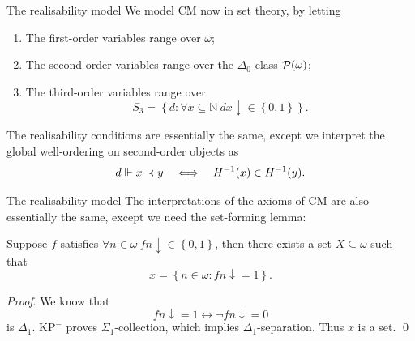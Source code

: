 \documentclass{beamer}
\begin{document}
\begin{frame}{The realisability model}
  We model $\mathrm{CM}$ now in set theory, by letting
  \begin{enumerate}
    \item The first-order variables range over $\omega$;
    \item The second-order variables range over the $\Delta_0$-class $\mathcal{P}\mleft(\omega\mright)$;
    \item The third-order variables range over
          \[S_3 = \left\{d : \forall x \subseteq \mathbb{N} \ dx {\downarrow} \in \left\{0, 1\right\}\right\}.\]
  \end{enumerate}

  The realisability conditions are essentially the same, except we interpret the global well-ordering on second-order objects as
  \[d \Vdash x \prec y \quad \Longleftrightarrow \quad H^{-1}\mleft(x\mright) \in H^{-1}\mleft(y\mright).\]
\end{frame}

\begin{frame}{The realisability model}
  The interpretations of the axioms of $\mathrm{CM}$ are also essentially the same, except we need the set-forming lemma:

  \begin{lemma}
    Suppose $f$ satisfies $\forall n \in \omega \ fn {\downarrow} \in \left\{0, 1\right\}$, then there exists a set $X \subseteq \omega$ such that
    \[x = \left\{n \in \omega : fn {\downarrow} = 1\right\}.\]
  \end{lemma}

  \emph{Proof}. We know that
  \[fn {\downarrow} = 1 \leftrightarrow \neg fn {\downarrow} = 0\]
  is $\Delta_1$. $\mathrm{KP}^-$ proves $\Sigma_1$-collection, which implies $\Delta_1$-separation. Thus $x$ is a set. \qed
\end{frame}
\end{document}
